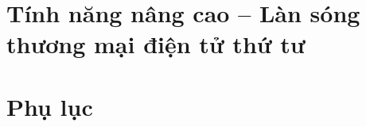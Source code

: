 \documentclass[12pt, a4paper]{report}
\begin{document}
\chapter{Tính năng nâng cao -- Làn sóng thương mại điện tử thứ tư}
\label{chap:advanced}


\chapter*{Phụ lục}


\end{document}
